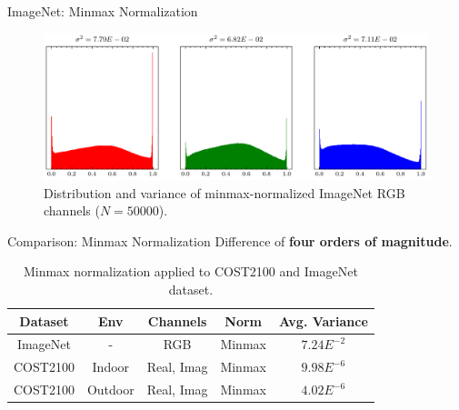 \documentclass{beamer}
\begin{document}
  \begin{frame}{ImageNet: Minmax Normalization}
    \begin{figure}[htb]
      \centering
      \includegraphics[width=.9\textwidth]{imagenet_rgb_dist.pdf}
      \medskip
      \caption{Distribution and variance of minmax-normalized ImageNet RGB channels ($N=50000$).}
      \label{fig:imagenet_dist}
    \end{figure}
  \end{frame}

  \begin{frame}{Comparison: Minmax Normalization}
    Difference of \textbf{four orders of magnitude}.
    \begin{table}[htb]
      \begin{center}
        \begin{tabular}{|c|c|c|c|c|}
        \hline
        \textbf{Dataset} & \textbf{Env} & \textbf{Channels} & \textbf{Norm} & \textbf{Avg. Variance} \\ \hline
        ImageNet         & -            & RGB                 & Minmax                 & \underline{$7.24E^{-2}$}       \\ \hline
        COST2100         & Indoor       & Real, Imag          & Minmax                 & \underline{$9.98E^{-6}$}       \\ \hline          
        COST2100         & Outdoor      & Real, Imag          & Minmax                 & \underline{$4.02E^{-6}$}       \\ \hline
        \end{tabular}
        \caption{Minmax normalization applied to COST2100 and ImageNet dataset.}
        \label{tab:minmax-compare} 
      \end{center}
    \end{table}
  \end{frame}
\end{document}
